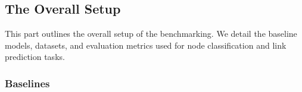 


\subsection{The Overall Setup} 
\label{sec:The Overall Setup}
This part outlines the overall setup of the benchmarking. We detail the baseline models, datasets, and evaluation metrics used for node classification and link prediction tasks.

\subsubsection{Baselines}


